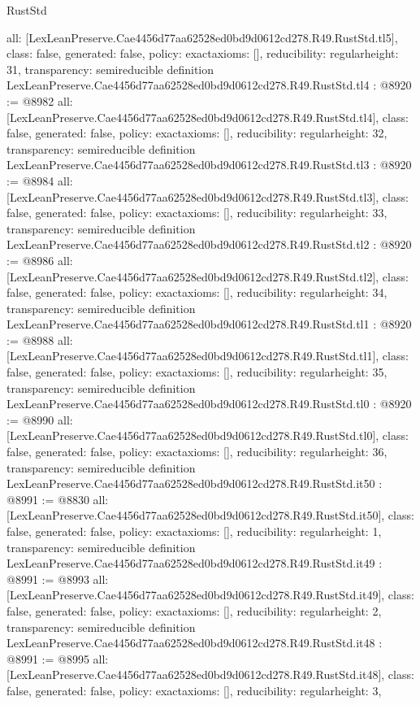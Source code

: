 \begin{lexlean}{RustStd}
\begin{coremodule}
{  all: [LexLeanPreserve.Cae4456d77aa62528ed0bd9d0612cd278.R49.RustStd.tl5],
  class: false,
  generated: false,
  policy: exact{axioms: []},
  reducibility: regular{height: 31},
  transparency: semireducible
}
definition LexLeanPreserve.Cae4456d77aa62528ed0bd9d0612cd278.R49.RustStd.tl4 : @8920 := @8982 {
  all: [LexLeanPreserve.Cae4456d77aa62528ed0bd9d0612cd278.R49.RustStd.tl4],
  class: false,
  generated: false,
  policy: exact{axioms: []},
  reducibility: regular{height: 32},
  transparency: semireducible
}
definition LexLeanPreserve.Cae4456d77aa62528ed0bd9d0612cd278.R49.RustStd.tl3 : @8920 := @8984 {
  all: [LexLeanPreserve.Cae4456d77aa62528ed0bd9d0612cd278.R49.RustStd.tl3],
  class: false,
  generated: false,
  policy: exact{axioms: []},
  reducibility: regular{height: 33},
  transparency: semireducible
}
definition LexLeanPreserve.Cae4456d77aa62528ed0bd9d0612cd278.R49.RustStd.tl2 : @8920 := @8986 {
  all: [LexLeanPreserve.Cae4456d77aa62528ed0bd9d0612cd278.R49.RustStd.tl2],
  class: false,
  generated: false,
  policy: exact{axioms: []},
  reducibility: regular{height: 34},
  transparency: semireducible
}
definition LexLeanPreserve.Cae4456d77aa62528ed0bd9d0612cd278.R49.RustStd.tl1 : @8920 := @8988 {
  all: [LexLeanPreserve.Cae4456d77aa62528ed0bd9d0612cd278.R49.RustStd.tl1],
  class: false,
  generated: false,
  policy: exact{axioms: []},
  reducibility: regular{height: 35},
  transparency: semireducible
}
definition LexLeanPreserve.Cae4456d77aa62528ed0bd9d0612cd278.R49.RustStd.tl0 : @8920 := @8990 {
  all: [LexLeanPreserve.Cae4456d77aa62528ed0bd9d0612cd278.R49.RustStd.tl0],
  class: false,
  generated: false,
  policy: exact{axioms: []},
  reducibility: regular{height: 36},
  transparency: semireducible
}
definition LexLeanPreserve.Cae4456d77aa62528ed0bd9d0612cd278.R49.RustStd.it50 : @8991 := @8830 {
  all: [LexLeanPreserve.Cae4456d77aa62528ed0bd9d0612cd278.R49.RustStd.it50],
  class: false,
  generated: false,
  policy: exact{axioms: []},
  reducibility: regular{height: 1},
  transparency: semireducible
}
definition LexLeanPreserve.Cae4456d77aa62528ed0bd9d0612cd278.R49.RustStd.it49 : @8991 := @8993 {
  all: [LexLeanPreserve.Cae4456d77aa62528ed0bd9d0612cd278.R49.RustStd.it49],
  class: false,
  generated: false,
  policy: exact{axioms: []},
  reducibility: regular{height: 2},
  transparency: semireducible
}
definition LexLeanPreserve.Cae4456d77aa62528ed0bd9d0612cd278.R49.RustStd.it48 : @8991 := @8995 {
  all: [LexLeanPreserve.Cae4456d77aa62528ed0bd9d0612cd278.R49.RustStd.it48],
  class: false,
  generated: false,
  policy: exact{axioms: []},
  reducibility: regular{height: 3},
}
\end{coremodule}
\end{lexlean}
